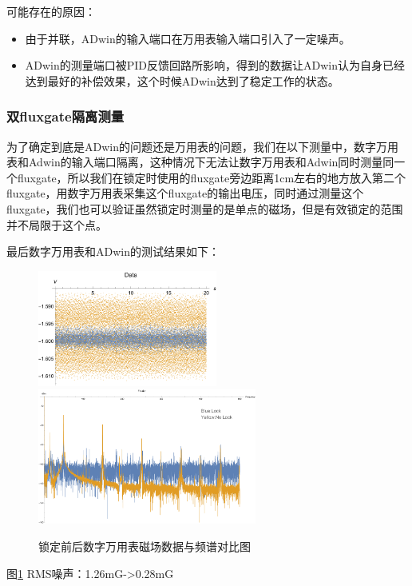 \documentclass[onecolumn,a4paper,10pt]{article}
\begin{document}
可能存在的原因：

\begin{itemize}
\item 由于并联，ADwin的输入端口在万用表输入端口引入了一定噪声。
\item ADwin的测量端口被PID反馈回路所影响，得到的数据让ADwin认为自身已经达到最好的补偿效果，这个时候ADwin达到了稳定工作的状态。
\end{itemize}

\subsubsection{双fluxgate隔离测量}
为了确定到底是ADwin的问题还是万用表的问题，我们在以下测量中，数字万用表和Adwin的输入端口隔离，这种情况下无法让数字万用表和Adwin同时测量同一个fluxgate，所以我们在锁定时使用的fluxgate旁边距离1cm左右的地方放入第二个fluxgate，用数字万用表采集这个fluxgate的输出电压，同时通过测量这个fluxgate，我们也可以验证虽然锁定时测量的是单点的磁场，但是有效锁定的范围并不局限于这个点。

最后数字万用表和ADwin的测试结果如下：
\begin{figure}[htbp]
\centering
\includegraphics[height=1.5in]{Data-Sep-multimeter}%
\hspace{0.4in}%
\includegraphics[height=1.75in]{Fourier-Sep-multimeter}
\caption{锁定前后数字万用表磁场数据与频谱对比图}
\label{fig:1105}
\end{figure}

图\ref{fig:1105} RMS噪声：1.26mG->0.28mG
\end{document}

